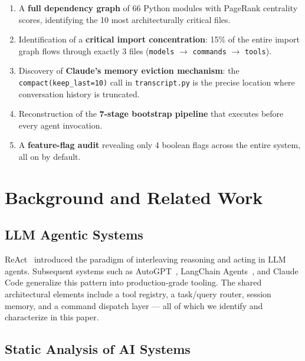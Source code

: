\documentclass[conference]{IEEEtran}
\begin{document}
\begin{enumerate}
  \item A \textbf{full dependency graph} of 66 Python modules with
        PageRank centrality scores, identifying the 10 most architecturally
        critical files.

  \item Identification of a \textbf{critical import concentration}: 15\%
        of the entire import graph flows through exactly 3 files
        (\texttt{models} $\to$ \texttt{commands} $\to$ \texttt{tools}).

  \item Discovery of \textbf{Claude's memory eviction mechanism}: the
        \texttt{compact(keep\_last=10)} call in \texttt{transcript.py}
        is the precise location where conversation history is truncated.

  \item Reconstruction of the \textbf{7-stage bootstrap pipeline} that
        executes before every agent invocation.

  \item A \textbf{feature-flag audit} revealing only 4 boolean flags
        across the entire system, all on by default.
\end{enumerate}

\section{Background and Related Work}

\subsection{LLM Agentic Systems}

ReAct~\cite{yao2022react} introduced the paradigm of interleaving
reasoning and acting in LLM agents. Subsequent systems such as
AutoGPT~\cite{significantgravitas2023autogpt}, LangChain
Agents~\cite{langchain2023}, and Claude Code generalize this pattern
into production-grade tooling. The shared architectural elements
include a tool registry, a task/query router, session memory, and
a command dispatch layer --- all of which we identify and characterize
in this paper.

\subsection{Static Analysis of AI Systems}
\end{document}
